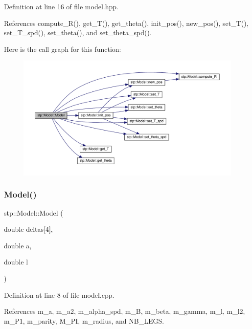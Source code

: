 Definition at line 16 of file model.\+hpp.



References compute\+\_\+\+R(), get\+\_\+\+T(), get\+\_\+theta(), init\+\_\+pos(), new\+\_\+pos(), set\+\_\+\+T(), set\+\_\+\+T\+\_\+spd(), set\+\_\+theta(), and set\+\_\+theta\+\_\+spd().

Here is the call graph for this function\+:\nopagebreak
\begin{figure}[H]
\begin{center}
\leavevmode
\includegraphics[width=350pt]{classstp_1_1_model_a771583e4fa62890a4c86b30ada77a9e5_cgraph}
\end{center}
\end{figure}
\mbox{\label{classstp_1_1_model_ac5ce800e21e055dcd219fcc16bb84554}} 
\subsubsection{\texorpdfstring{Model()}{Model()}\hspace{0.1cm}{\footnotesize\ttfamily [2/2]}}
{\footnotesize\ttfamily stp\+::\+Model\+::\+Model (\begin{DoxyParamCaption}\item[{double}]{deltas\mbox{[}4\mbox{]},  }\item[{double}]{a,  }\item[{double}]{l }\end{DoxyParamCaption})}



Definition at line 8 of file model.\+cpp.



References m\+\_\+a, m\+\_\+a2, m\+\_\+alpha\+\_\+spd, m\+\_\+B, m\+\_\+beta, m\+\_\+gamma, m\+\_\+l, m\+\_\+l2, m\+\_\+\+P1, m\+\_\+parity, M\+\_\+\+PI, m\+\_\+radius, and N\+B\+\_\+\+L\+E\+GS.



